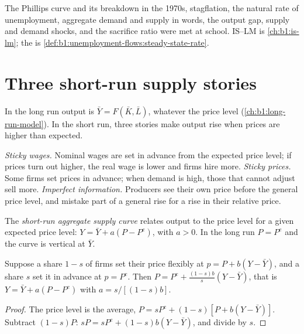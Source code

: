 \begin{recall}
The Phillips curve and its breakdown in the 1970s, stagflation, the
natural rate of unemployment, aggregate demand and supply in words, the
output gap, supply and demand shocks, and the sacrifice ratio were met at
school. IS--LM is \cref{ch:b1:is-lm}; the  is
\cref{def:b1:unemployment-flows:steady-state-rate}.
\end{recall}

\section{Three short-run supply stories}\label{sec:b1:aggregate-supply:stories}

In the long run output is $\bar Y = F(\bar K, \bar L)$, whatever the price level
(\cref{ch:b1:long-run-model}). In the short run, three stories make output
rise when prices are higher than expected.

\emph{Sticky wages.} Nominal wages are set in advance from the expected
price level; if prices turn out higher, the real wage is lower and firms
hire more. \emph{Sticky prices.} Some firms set prices in advance; when
demand is high, those that cannot adjust sell more. \emph{Imperfect
information.} Producers see their own price before the general price
level, and mistake part of a general rise for a rise in their relative
price.

\begin{definition}\label{def:b1:aggregate-supply:sras}
The \emph{short-run aggregate supply curve} relates output to the price level
for a given expected price level: $Y = \bar Y + a(P - P^e)$, with $a > 0$. In the long
run $P = P^e$ and the curve is vertical at $\bar Y$.
\end{definition}

\begin{proposition}\label{prop:b1:aggregate-supply:sticky}
Suppose a share $1 - s$ of firms set their price flexibly at $p = P + b(Y - \bar Y)$, and a
share $s$ set it in advance at $p = P^e$. Then $P = P^e + \frac{(1 - s)b}{s}(Y - \bar Y)$, that is
$Y = \bar Y + a(P - P^e)$ with $a = s/[(1 - s)b]$.
\end{proposition}

\begin{proof}
The price level is the average, $P = sP^e + (1 - s)[P + b(Y - \bar Y)]$. Subtract $(1 - s)P$:
$sP = sP^e + (1 - s)b(Y - \bar Y)$, and divide by $s$.
\end{proof}


